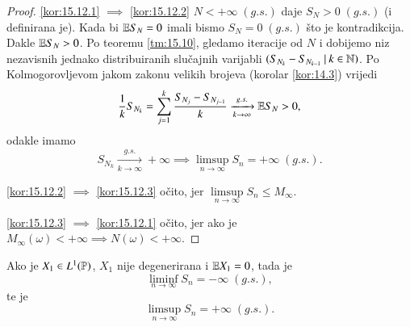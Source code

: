 \begin{proof}
    \ref{kor:15.12.1} $\implies$ \ref{kor:15.12.2} $N < +\infty \; (g.s.)$ daje $S_N > 0 \; (g.s.)$ (i definirana je).
    Kada bi $\mathbb{E} S_N = 0$ imali bismo $S_N = 0 \; (g.s.)$ \v sto je kontradikcija.
    Dakle $\mathbb{E} S_N > 0$.
    Po teoremu \ref{tm:15.10}, gledamo iteracije od $N$ i dobijemo niz nezavisnih jednako distribuiranih slu\v cajnih varijabli $({S_{N_k} - S_{N_{k - 1}}} \: | \: {k \in \mathbb{N}})$.
    Po Kolmogorovljevom jakom zakonu velikih brojeva (korolar \ref{kor:14.3}) vrijedi
    \begin{equation*}
        \frac{1}{k} S_{N_k} = \sum\limits_{j = 1}^{k} \frac{S_{N_j} - S_{N_{j-1}}}{k} \xrightarrow[k \to \infty]{g.s.} \mathbb{E} S_N > 0,
    \end{equation*}
    odakle imamo
    \begin{equation*}
        S_{N_k} \xrightarrow[k \to \infty]{g.s.} +\infty \implies \limsup\limits_{n \to \infty} S_n = +\infty \; (g.s.).
    \end{equation*}

    \ref{kor:15.12.2} $\implies$ \ref{kor:15.12.3} o\v cito, jer $\limsup\limits_{n \to \infty} S_n \leq M_{\infty}$.

    \ref{kor:15.12.3} $\implies$ \ref{kor:15.12.1} o\v cito, jer ako je $M_{\infty} (\omega) < +\infty \implies N (\omega) < +\infty$.
\end{proof}

\begin{tm}  \label{tm:15.13}
    Ako je $X_1 \in L^1 (\mathbb{P})$, $X_1$ nije degenerirana i $\mathbb{E} X_1 = 0$, tada je
    \begin{equation*}
        \liminf\limits_{n \to \infty} S_n = -\infty \; (g.s.),
    \end{equation*}
    te je
    \begin{equation*}
        \limsup\limits_{n \to \infty} S_n = +\infty \; (g.s.).
    \end{equation*}
\end{tm}

